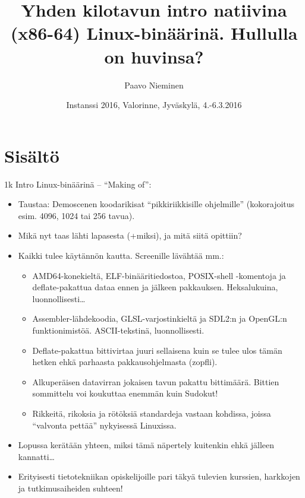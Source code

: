 \documentclass[pdf,10pt]{beamer}
\title[Linux 1k intro -- ``making of'']
{Yhden kilotavun intro natiivina (x86-64) Linux-binäärinä. Hullulla on huvinsa?}
\author{Paavo Nieminen}
\date{Instanssi 2016, Valorinne, Jyväskylä, 4.-6.3.2016}
\begin{document}
\begin{frame}
  \titlepage
\end{frame}

\beamerdefaultoverlayspecification{<+->}

\section{Sisältö}
\begin{frame}{1k Intro Linux-binäärinä -- ``Making of'':}
  \begin{itemize}
  \item Taustaa: Demoscenen koodarikisat ``pikkiriikkisille
    ohjelmille'' (kokorajoitus esim. 4096, 1024 tai 256 tavua).
  \item Mikä nyt taas lähti lapasesta (+miksi), ja mitä siitä opittiin?
  \item Kaikki tulee käytännön kautta. Screenille lävähtää mm.:
    \begin{itemize}
    \item AMD64-konekieltä, ELF-binääritiedostoa, POSIX-shell
      -komentoja ja deflate-pakattua dataa ennen ja jälkeen
      pakkauksen. Heksalukuina, luonnollisesti\ldots
    \item Assembler-lähdekoodia, GLSL-varjostinkieltä ja SDL2:n ja
      OpenGL:n funktionimistöä. ASCII-tekstinä, luonnollisesti.
    \item Deflate-pakattua bittivirtaa juuri sellaisena kuin se tulee
      ulos tämän hetken ehkä parhaasta pakkausohjelmasta (zopfli).
    \item Alkuperäisen datavirran jokaisen tavun pakattu bittimäärä.
      Bittien sommittelu voi koukuttaa enemmän kuin Sudokut!
    \item Rikkeitä, rikoksia ja rötöksiä standardeja vastaan kohdissa,
      joissa ``valvonta pettää'' nykyisessä Linuxissa.
    \end{itemize}
  \item Lopussa kerätään yhteen, miksi tämä näpertely kuitenkin ehkä
    jälleen kannatti\ldots
  \item Erityisesti tietotekniikan opiskelijoille pari täkyä tulevien
    kurssien, harkkojen ja tutkimusaiheiden suhteen!
  \end{itemize}
\end{frame}
\end{document}
